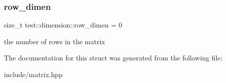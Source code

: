 \subsubsection{\texorpdfstring{row\_dimen}{row\_dimen}}
{\footnotesize\ttfamily size\+\_\+t test\+::dimension\+::row\+\_\+dimen = 0}



the number of rows in the matrix 



The documentation for this struct was generated from the following file\+:\begin{DoxyCompactItemize}
\item 
include/matrix.\+hpp\end{DoxyCompactItemize}
